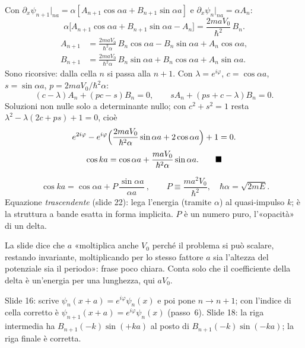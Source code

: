 \documentclass[11pt,a4paper]{article}
\begin{document}
\begin{dimostrazione}
\[\]
Con $\partial_x\psi_{n+1}|_{na}=\alpha[A_{n+1}\cos\alpha a+B_{n+1}\sin\alpha a]$ e $\partial_x\psi_n|_{na}=\alpha A_n$:
\[
\alpha\bigl[A_{n+1}\cos\alpha a+B_{n+1}\sin\alpha a-A_n\bigr]=\frac{2maV_0}{\hbar^2}\,B_n .
\]
\begin{align*}
A_{n+1}&=\frac{2maV_0}{\hbar^2\alpha}\,B_n\cos\alpha a-B_n\sin\alpha a+A_n\cos\alpha a,\\
B_{n+1}&=\frac{2maV_0}{\hbar^2\alpha}\,B_n\sin\alpha a+B_n\cos\alpha a+A_n\sin\alpha a .
\end{align*}
Sono ricorsive: dalla cella $n$ si passa alla $n+1$.
Con $\lambda=e^{i\varphi}$, $c=\cos\alpha a$, $s=\sin\alpha a$, $p=2maV_0/\hbar^2\alpha$:
\[
(c-\lambda)A_n+(pc-s)B_n=0,\qquad sA_n+(ps+c-\lambda)B_n=0 .
\]
Soluzioni non nulle solo a determinante nullo; con $c^2+s^2=1$ resta $\lambda^2-\lambda(2c+ps)+1=0$, cioè
\[
e^{2i\varphi}-e^{i\varphi}\Bigl(\frac{2maV_0}{\hbar^2\alpha}\sin\alpha a+2\cos\alpha a\Bigr)+1=0.
\]
\[
\cos ka=\cos\alpha a+\frac{maV_0}{\hbar^2\alpha}\sin\alpha a.\qed
\]
\end{dimostrazione}

\begin{chiave}
\[
\boxed{\ \cos ka=\cos\alpha a+P\,\frac{\sin\alpha a}{\alpha a}\ },\qquad
P\equiv\frac{ma^2V_0}{\hbar^2},\quad \hbar\alpha=\sqrt{2mE}.
\]
Equazione \emph{trascendente} (slide 22): lega l'energia (tramite $\alpha$) al quasi-impulso $k$; è la struttura a bande esatta in forma implicita.
$P$ è un numero puro, l'«opacità» di un delta.
\end{chiave}

\begin{osservazione}
La slide dice che $a$ «moltiplica anche $V_0$ perché il problema si può scalare, restando invariante, moltiplicando per lo stesso fattore $a$ sia l'altezza del
potenziale sia il periodo»: frase poco chiara. Conta solo che il coefficiente della delta è un'energia per una lunghezza, qui $aV_0$.
\end{osservazione}
\begin{osservazione}
Slide 16: scrive $\psi_n(x+a)=e^{i\varphi}\psi_n(x)$ e poi pone $n\to n+1$; con l'indice di cella corretto è $\psi_{n+1}(x+a)=e^{i\varphi}\psi_n(x)$ (passo~6).
Slide 18: la riga intermedia ha $B_{n+1}(-k)\sin(+ka)$ al posto di $B_{n+1}(-k)\sin(-ka)$; la riga finale è corretta.
\end{osservazione}
\end{document}
